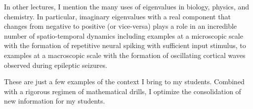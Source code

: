 \documentclass[a4paper,11pt]{letter}
\begin{document}
In other lectures, I mention the many uses of eigenvalues in biology, physics, and chemistry. In particular, imaginary eigenvalues with a real component that changes from negative to positive (or vice-versa) plays a role in an incredible number of spatio-temporal dynamics including examples at a microscopic scale with the formation of repetitive neural spiking with sufficient input stimulus, to examples at a macroscopic scale with the formation of oscillating cortical waves observed during epileptic seizures.

These are just a few examples of the context I bring to my students. Combined with a rigorous regimen of mathematical drills, I optimize the consolidation of new information for my students.
 
 
\end{document}
